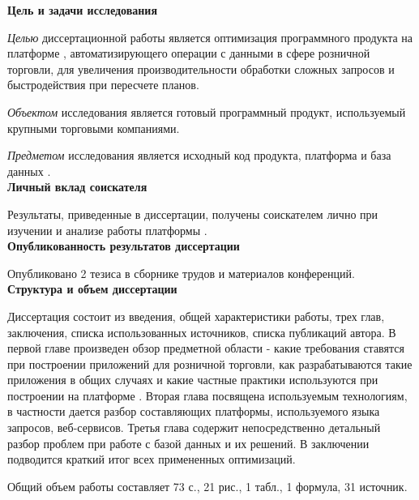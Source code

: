 
\textbf{Цель и задачи исследования}

\emph{Целью} диссертационной работы является  оптимизация программного продукта на платформе \LB, автоматизирующего операции с данными в сфере розничной торговли, для увеличения производительности обработки сложных запросов и быстродействия при пересчете планов.

\emph{Объектом} исследования является готовый программный продукт, используемый крупными торговыми компаниями.

\emph{Предметом} исследования является исходный код продукта, платформа и база данных \LB.\\



\textbf{Личный вклад соискателя}

Результаты, приведенные в диссертации, получены соискателем лично при изучении и анализе работы платформы \LB.\\


\textbf{Опубликованность результатов диссертации}

Опубликовано 2 тезиса в сборнике трудов и материалов конференций.\\

\textbf{Структура и объем диссертации}

Диссертация состоит из введения, общей характеристики работы, трех глав, заключения, списка использованных источников, списка публикаций автора. В первой главе произведен обзор предметной области - какие требования ставятся при построении приложений для розничной торговли, как разрабатываются такие приложения в общих случаях и какие частные практики используются при построении на платформе \LB. Вторая глава посвящена используемым технологиям, в частности дается разбор составляющих платформы, используемого языка запросов, веб-сервисов. Третья глава содержит непосредственно детальный разбор проблем при работе с базой данных и их решений. В заключении подводится краткий итог всех примененных оптимизаций.


Общий объем работы составляет 73 с., 21 рис., 1 табл., 1 формула, 31 источник.
